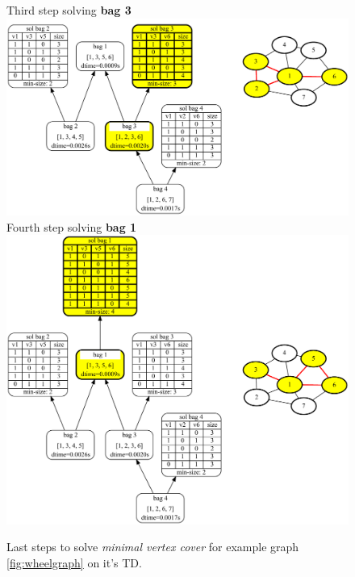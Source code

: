 \documentclass[a4paper, 12pt, bibliography=totoc]{scrartcl}
\begin{document}
\begin{figure}[H]
	\centering
	Third step solving \textbf{bag 3} \vspace{1em}\\
	
	\includegraphics[width=0.9\linewidth]{images/WheelGraph7/combined4.pdf}\\
	\vspace{0.5em}
	Fourth step solving \textbf{bag 1}\\
	
	\vspace{0.6em}
	\includegraphics[width=0.9\linewidth]{images/WheelGraph7/combined5.pdf}\\
	
	\caption{Last steps to solve \textit{minimal vertex cover} for example graph \ref{fig:wheelgraph} on it's TD.}
	\label{fig:wheelgraphc45}
\end{figure}


\end{document}
